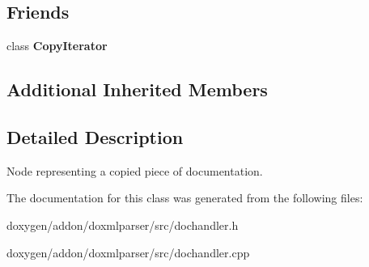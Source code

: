 \subsection*{Friends}
\begin{DoxyCompactItemize}
\item 
\mbox{\label{class_copy_handler_a6d99f95edf83a9c83db0307bc0e58e48}} 
class {\bfseries Copy\+Iterator}
\end{DoxyCompactItemize}
\subsection*{Additional Inherited Members}


\subsection{Detailed Description}
Node representing a copied piece of documentation. 



The documentation for this class was generated from the following files\+:\begin{DoxyCompactItemize}
\item 
doxygen/addon/doxmlparser/src/dochandler.\+h\item 
doxygen/addon/doxmlparser/src/dochandler.\+cpp\end{DoxyCompactItemize}
